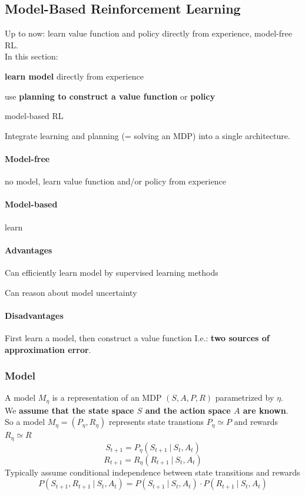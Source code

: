 \documentclass[10pt]{report}
\begin{document}
\subsection{Model-Based Reinforcement Learning}
Up to now: learn value function and policy directly from experience, model-free RL.\\
In this section:\begin{list}{}{}
	\item \textbf{learn model} directly from experience
	\item use \textbf{planning to construct a value function} or \textbf{policy}
	\item model-based RL
\end{list}
Integrate learning and planning (= solving an MDP) into a single architecture.
\paragraph{Model-free} no model, learn value function and/or policy from experience
\paragraph{Model-based} learn %
\paragraph{Advantages}\begin{list}{}{}
	\item Can efficiently learn model by supervised learning methods
	\item Can reason about model uncertainty
\end{list}
\paragraph{Disadvantages}\begin{list}{}{}
	\item First learn a model, then construct a value function
	I.e.: \textbf{two sources of approximation error}.
\end{list}
\subsubsection{Model}
A model $M_\eta$ is a representation of an MDP $(S,A,P,R)$ parametrized by $\eta$.\\
We \textbf{assume that the state space $S$ and the action space $A$ are known}.\\
So a model $M_\eta=(P_\eta,R_\eta)$ represents state transtions $P_\eta \simeq P$ and rewards $R_\eta \simeq R$
$$S_{t+1} = P_\eta(S_{t+1}\:|\:S_t,A_t)$$
$$R_{t+1} = R_\eta(R_{t+1}\:|\:S_t,A_t)$$
Typically assume conditional independence between state transitions and rewards
$$P(S_{t+1},R_{t+1}\:|\:S_t,A_t) = P(S_{t+1}\:|\:S_t,A_t)\cdot P(R_{t+1}\:|\:S_t,A_t)$$
\end{document}
